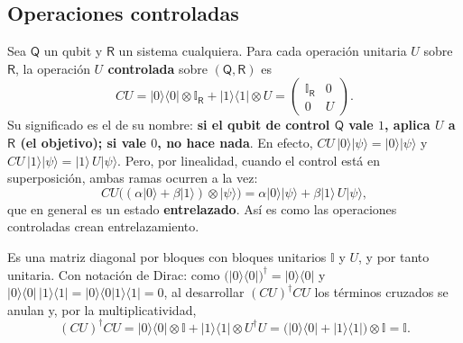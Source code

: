 \documentclass[11pt, a4paper, twoside, openright]{report}
\begin{document}
\subsection{Operaciones controladas}

\noindent Sea $\mathsf{Q}$ un qubit y $\mathsf{R}$ un sistema cualquiera. Para cada operación unitaria $U$ sobre $\mathsf{R}$, la operación \textbf{$U$ controlada} sobre $(\mathsf{Q},\mathsf{R})$ es
\[ CU = |0\rangle\langle0|\otimes\mathbb{I}_{\mathsf{R}} + |1\rangle\langle1|\otimes U = \begin{pmatrix}\mathbb{I}_{\mathsf{R}} & 0 \\ 0 & U\end{pmatrix}. \]
Su significado es el de su nombre: \textbf{si el qubit de control $\mathsf{Q}$ vale $1$, aplica $U$ a $\mathsf{R}$ (el objetivo); si vale $0$, no hace nada}. En efecto, $CU\,|0\rangle|\psi\rangle = |0\rangle|\psi\rangle$ y $CU\,|1\rangle|\psi\rangle = |1\rangle\,U|\psi\rangle$. Pero, por linealidad, cuando el control está en superposición, ambas ramas ocurren a la vez:
\[ CU\big((\alpha|0\rangle + \beta|1\rangle)\otimes|\psi\rangle\big) = \alpha|0\rangle|\psi\rangle + \beta|1\rangle\,U|\psi\rangle, \]
que en general es un estado \textbf{entrelazado}. Así es como las operaciones controladas crean entrelazamiento.

\begin{tcolorbox}[colback=gray!5!white,colframe=gray!75!black,title=\textbf{Las operaciones controladas son unitarias}]
Es una matriz diagonal por bloques con bloques unitarios $\mathbb{I}$ y $U$, y por tanto unitaria. Con notación de Dirac: como $\big(|0\rangle\langle0|\big)^\dagger = |0\rangle\langle0|$ y $|0\rangle\langle0|\,|1\rangle\langle1| = |0\rangle\langle 0|1\rangle\langle1| = 0$, al desarrollar $(CU)^\dagger CU$ los términos cruzados se anulan y, por la multiplicatividad,
\[ (CU)^\dagger CU = |0\rangle\langle0|\otimes\mathbb{I} + |1\rangle\langle1|\otimes U^\dagger U = \big(|0\rangle\langle0| + |1\rangle\langle1|\big)\otimes\mathbb{I} = \mathbb{I}. \]
\end{tcolorbox}
\end{document}
